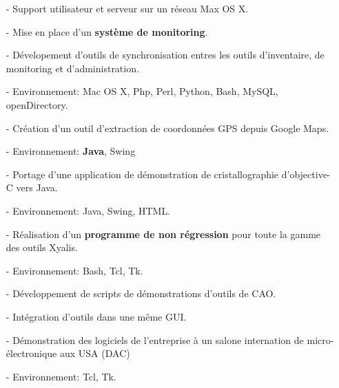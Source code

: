\documentclass[10pt,a4paper]{moderncv}
\begin{document}
{
\begin{itemize}
\item[-]{Support utilisateur et serveur sur un réseau Max OS X.}
\item[-]{Mise en place d'un \textbf{système de monitoring}.}
\item[-]{Dévelopement d'outils de synchronisation entres les outils d'inventaire, de monitoring et d'administration.}
\item[-]{Environnement: Mac OS X, Php, Perl, Python, Bash, MySQL, openDirectory.}
\end{itemize}
}

{
\begin{itemize}
\item[-]{Création d'un outil d'extraction de coordonnées GPS depuis Google Maps.}
\item[-]{Environnement: \textbf{Java}, Swing}
\end{itemize}
}

{
\begin{itemize}
\item[-]{Portage d'une application de démonstration de cristallographie d'objective-C vers Java.}
\item[-]{Environnement: Java, Swing, HTML.}
\end{itemize}
}

{
\begin{itemize}
\item[-]{Réalisation d'un \textbf {programme de non régression} pour toute la gamme des outils Xyalis.}
\item[-]{Environnement: Bash, Tcl, Tk.}
\end{itemize}
}

{
\begin{itemize}
\item[-]{Développement de scripts de démonstrations d'outils de CAO.}
\item[-]{Intégration d'outils dans une même GUI.}
\item[-]{Démonstration des logiciels de l'entreprise à un salone internation de micro-électronique aux USA (DAC)}
\item[-]{Environnement: Tcl, Tk.}
\end{itemize}
}
\end{document}
